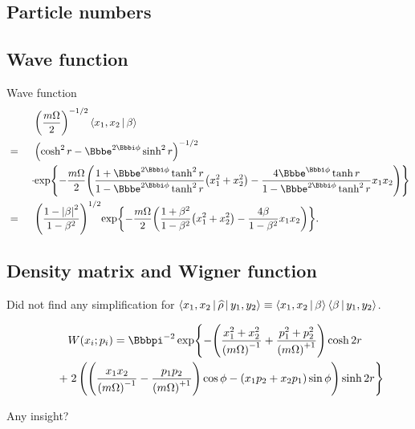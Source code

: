 \subsection{Particle numbers}



\subsection{Wave function}

\begin{nameddef}{Wave function}
\begin{alignat}{3}
&\phantom{{}={}}&&\rbr{\frac{m\Omega}{2}}^{-1/2}\Braket{x_1, x_2 | \beta} 
\nonumber \\
&=&& \rbr{\cosh^2 r - \ee^{2\ii\phi} \sinh^2 r}^{-1/2} \nonumber \\
&&\cdot& \cfun{\exp}{-\frac{m\Omega}{2} \rbr{\frac{1 + \ee^{2\ii\phi}\tanh^2 r}%
{1 - \ee^{2\ii\phi}\tanh^2 r} \rbr{x_1^2+x_2^2} - \frac{4\ee^{\ii\phi}
\tanh r}{1 - \ee^{2\ii\phi}\tanh^2 r} x_1 x_2  }} \nonumber \\
&=&& \rbr{\frac{1-\vbr{\beta}^2}{1-\beta^2}}^{1/2}
\cfun{\exp}{-\frac{m\Omega}{2} \rbr{\frac{1+\beta^2}{1-\beta^2}\rbr{x_1^2+x_2^2}
- \frac{4\beta}{1-\beta^2} x_1 x_2}}.
\end{alignat}
\end{nameddef}

\subsection{Density matrix and Wigner function}

Did not find any simplification for $\Braket{x_1, x_2 | \widehat{\rho} | y_1,
y_2} \equiv \Braket{x_1, x_2 | \beta} \Braket{\beta | y_1,y_2} $.

\begin{alignat}{3}
&\phantom{{}={}}&&\rfun{W}{x_i; p_i} = \pp^{-2}
\exp\mathopen{}\left\{ -\rbr{
\frac{x_1^2+x_2^2}{\rbr{m\Omega}^{-1}}+
\frac{p_1^2+p_2^2}{\rbr{m\Omega}^{+1}}}\cosh 2r \mathclose{}\right.
\nonumber \\
&&+& \left.2\left(
 \rbr{\frac{x_1 x_2}{\rbr{m\Omega}^{-1}}
-\frac{p_1 p_2}{\rbr{m\Omega}^{+1}}} \cos\phi
-\rbr{x_1 p_2 + x_2 p_1} \sin\phi\right)\sinh 2r\right\}
\end{alignat}

Any insight?